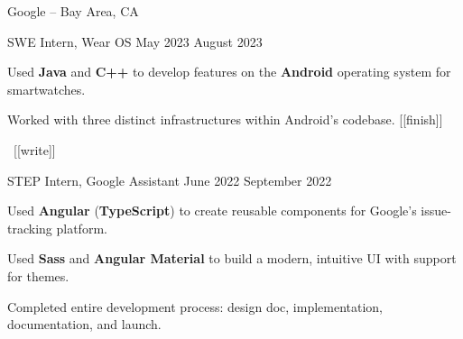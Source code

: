 \begin{entry}{Google -- Bay Area, CA}

	\entryItem
		{SWE Intern, Wear OS}
		{May 2023}
		{August 2023}
	
		\begin{items}
			\item Used \textbf{Java} and \textbf{C++} to develop features on the \textbf{Android} operating system for smartwatches.
			\item Worked with three distinct infrastructures within	 Android's codebase. [[finish]]
			\item ~[[write]]
		\end{items}

	\entryItem
		{STEP Intern, Google Assistant}
		{June 2022}
		{September 2022}

		\begin{items}
			\item Used \textbf{Angular} (\textbf{TypeScript}) to create reusable components for Google's issue-tracking platform.
			\item Used \textbf{Sass} and \textbf{Angular Material} to build a modern, intuitive UI with support for themes.
			\item Completed entire development process: design doc, implementation, documentation, and launch.
		\end{items}

\end{entry}
